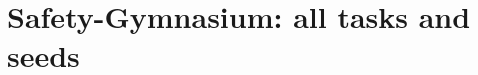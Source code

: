 \documentclass{article}
\begin{document}
\section{Safety-Gymnasium: all tasks and seeds}
\label{app:sg}

\begin{table}[ht]
\centering
\caption{All 32 (task, seed, agent) cells, $n=400$ episodes per policy. $J_B$ and $J_A$: ground-truth costs of baseline and agent. $J_{\text{aware}}$ for both alphabets. TV: plug-in, cost-relevant alphabet. KS$^+_{\mathcal T}$: plug-in with the pilot-selected onset set. TV fin., KS$^+_{\mathcal T}$ is the plug-in bound with the pilot-selected $\mathcal T$ and $\eta$ (0.05, or 0.055 for seed 2); KS$^+_{\mathcal T}$ Hoeff.\ and EB: finite-sample bounds with the same $\mathcal T$, $\eta$.}
\label{tab:sgall}
\scriptsize

\end{table}



\end{document}
